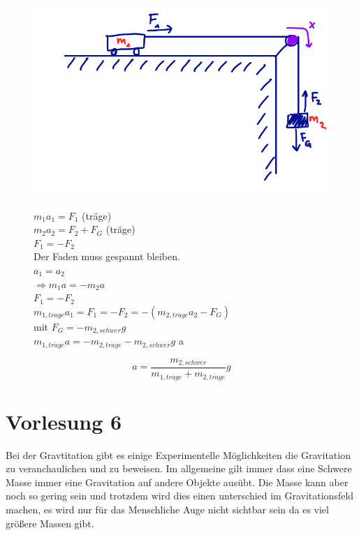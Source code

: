 \documentclass[11pt]{article}
\begin{document}
		\begin{figure}[htbp]
			\begin{minipage}[t]{6cm}
				\vspace{0pt}
				\centering
				\includegraphics[scale=0.35]{IMG_E8A9C85E8431-1.jpeg}
			\end{minipage}
			\hfill
			\begin{minipage}[t]{6cm}
				\vspace{0pt}
				$ m_1 a_1 = F_1 $ (träge)\\
				$ m_2 a_2 = F_2 + F_G $ (träge)\\
				$ F_1 = - F_2 $\\
				Der Faden muss gespannt bleiben.\\
				$ a_1 = a_2 $\\
				$\Rightarrow m_1 a = - m_2 a $\\
				$ F_1 = -F_2 $\\
				$ m_{1, tr\ddot{a}ge} a_1 = F_1 = - F_2 = -(m_{2, tr\ddot{a}ge} a_2 -F_G) $\\
				mit $ F_G = -m_{2, schwer} g $\\
				$m_{1, tr\ddot{a}ge} a = - m_{2, tr\ddot{a}ge} - m_{2, schwer} g$	\ddot a
			\end{minipage}
		\end{figure}
		\[ a = \frac{m_{2, schwer}}{m_{1,tr\ddot{a}ge} + m_{2,tr\ddot{a}ge}} g \]
			\part{Vorlesung 6}
				Bei der Gravtitation gibt es einige Experimentelle Möglichkeiten die Gravitation zu veranchaulichen und zu beweisen. Im allgemeine gilt immer dass eine Schwere Masse immer eine Gravitation auf andere Objekte ausübt. Die Masse kann aber noch so gering sein und trotzdem wird dies einen unterschied im Gravitationsfeld machen, es wird nur für das Menschliche Auge nicht sichtbar sein da es viel größere Massen gibt.
\end{document}
